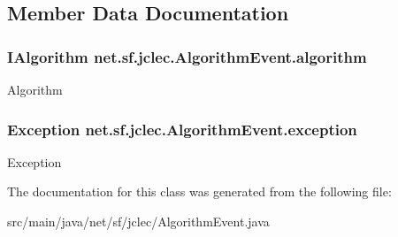 \subsection{Member Data Documentation}
\hypertarget{classnet_1_1sf_1_1jclec_1_1_algorithm_event_ae3332a37fbfc99e4c5eea8b0748c1e77}{
\subsubsection[{algorithm}]{\setlength{\rightskip}{0pt plus 5cm}I\-Algorithm net.\-sf.\-jclec.\-Algorithm\-Event.\-algorithm\hspace{0.3cm}{\ttfamily [protected]}}}\label{classnet_1_1sf_1_1jclec_1_1_algorithm_event_ae3332a37fbfc99e4c5eea8b0748c1e77}
Algorithm \hypertarget{classnet_1_1sf_1_1jclec_1_1_algorithm_event_aa8ed9d4190a583cbe4873dac89fdef7c}{
\subsubsection[{exception}]{\setlength{\rightskip}{0pt plus 5cm}Exception net.\-sf.\-jclec.\-Algorithm\-Event.\-exception\hspace{0.3cm}{\ttfamily [protected]}}}\label{classnet_1_1sf_1_1jclec_1_1_algorithm_event_aa8ed9d4190a583cbe4873dac89fdef7c}
Exception 

The documentation for this class was generated from the following file\-:\begin{DoxyCompactItemize}
\item 
src/main/java/net/sf/jclec/Algorithm\-Event.\-java\end{DoxyCompactItemize}
